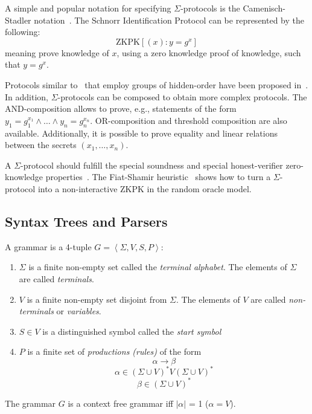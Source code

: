 A simple and popular notation for specifying $\Sigma$-protocols is the
Camenisch-Stadler notation~\cite{camenisch_stadler}. The Schnorr
Identification Protocol can be represented by the following:
\[
  \textrm{ZKPK}\left[ (x): y = g^x \right]
\]
meaning prove knowledge of $x$, using a zero knowledge proof of
knowledge, such that $y=g^x$.

Protocols similar to~\cite{schnorr_protocol} that employ groups of hidden-order have been proposed in~\cite{DBLP:conf/crypto/FujisakiO97,DBLP:journals/iacr/BangerterCKS008}. In addition, $\Sigma$-protocols can be composed to obtain more complex protocols. The AND-composition allows to prove, e.g., statements of the form $y_1 = g_1^{x_1} \land \ldots \land y_n = g_n^{x_n}$. OR-composition and threshold composition are also available. Additionally, it is possible to prove equality and linear relations between the secrets $(x_1,\ldots,x_n)$.

A $\Sigma$-protocol should fulfill the special soundness and special honest-verifier zero-knowledge properties~\cite{DamgardSigma2004}. The Fiat-Shamir heuristic~\cite{DBLP:conf/crypto/FiatS86} shows how to turn a $\Sigma$-protocol into a non-interactive ZKPK in the random oracle model.

\subsection{Syntax Trees and Parsers}

\begin{defn}[Grammar]
  A grammar is a 4-tuple $G = \left< \Sigma, V, S, P \right>$:
  \begin{enumerate}
  \item $\Sigma$ is a finite non-empty set called the \emph{terminal
    alphabet}. The elements of $\Sigma$ are called \emph{terminals}.
  \item $V$ is a finite non-empty set disjoint from $\Sigma$. The
    elements of $V$ are called \emph{non-terminals} or \emph{variables}.
  \item $S \in V$ is a distinguished symbol called the \emph{start symbol}
  \item $P$ is a finite set of \emph{productions (rules)} of the form
    $$ \alpha \rightarrow \beta $$
    $$ \alpha \in (\Sigma \cup V)^* V (\Sigma \cup V)^* $$
    $$ \beta \in (\Sigma \cup V)^* $$
  \end{enumerate}
\end{defn}

\begin{defn}
  The grammar $G$ is a context free grammar iff $|\alpha|$ = 1 ($\alpha = V$).
\end{defn}

